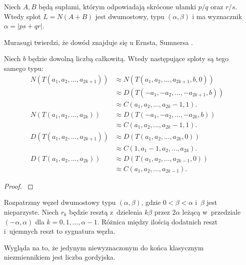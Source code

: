 \begin{proposition}
    Niech $A, B$ będą supłami, którym odpowiadają skrócone ułamki $p/q$ oraz $r/s$.
    Wtedy splot $L = N(A+B)$ jest dwumostowy, typu $(\alpha, \beta)$ i ma wyznacznik $\alpha = |ps + qr|$.
\end{proposition}

Murasugi \cite[twierdzenie 9.3.5]{murasugi1996} twierdzi, że dowód znajduje się u Ernsta, Sumnersa \cite[lemat 2.1]{ernst1990}.
%
%

\begin{proposition}
    Niech $b$ będzie dowolną liczbą całkowitą.
    Wtedy następujące sploty są tego samego typu:
    \begin{align}
        N(T(a_1, a_2, \ldots, a_{2k+1})) & \approx N(T(a_1, a_2, \ldots, a_{2k+1}, b, 0)) \\
                                         & \approx D(T(-a_1, -a_2, \ldots, -a_{2k+1}, b)) \\
                                         & \approx C(a_1, a_2, \ldots, a_{2k}-1, 1). \\
        N(T(a_1, a_2, \ldots, a_{2k}))   & \approx D(T(-a_1, -a_2, \ldots, -a_{2k}, b)) \\
                                         & \approx C(a_1, a_2, \ldots, a_{2k}-1, 1). \\
        D(T(a_1, a_2, \ldots, a_{2k+1})) & \approx D(T(a_1, a_2, \ldots, a_{2k}, 0)) \\
                                         & \approx C(1, a_1-1, a_2, \ldots, a_{2k}). \\
        D(T(a_1, a_2, \ldots, a_{2k}))   & \approx D(T(a_1, a_2, \ldots, a_{2k-1}, 0)) \\
                                         & \approx C(a_1, a_2, \ldots, a_{2k-1}).
    \end{align}
\end{proposition}

\begin{proof}
    \cite[fakt 9.3.4]{murasugi1996}
\end{proof}

\begin{proposition}
    Rozpatrzmy węzeł dwumostowy typu $(\alpha, \beta)$, gdzie $0 < \beta < \alpha$ i~$\beta$ jest nieparzyste.
    Niech $r_k$ będzie resztą z~dzielenia $k\beta$ przez $2\alpha$ leżącą w~przedziale $(-\alpha, \alpha)$ dla $k = 0, 1, \ldots, \alpha - 1$.
    Różnica między ilością dodatnich reszt i~ujemnych reszt to sygnatura węzła.
\end{proposition}

Wygląda na to, że jedynym niewyznaczonym do końca klasycznym niezmiennikiem jest liczba gordyjska.

%


